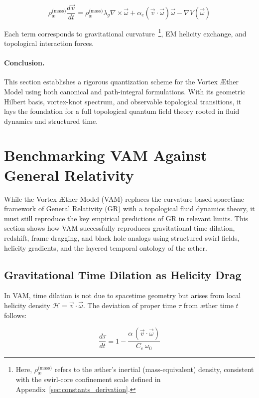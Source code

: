 \documentclass[preprint]{revtex4-2}
\begin{document}
    \[
    \rho_{\text{\ae}}^{\text{(mass)}} \frac{d\vec{v}}{dt} = \rho_{\text{\ae}}^{\text{(mass)}} \lambda_g \nabla \times \vec{\omega} + \alpha_e (\vec{v} \cdot \vec{\omega}) \vec{\omega} - \nabla V(\vec{\omega})
        \label{eq:euler_lagrange_swirl}
    \]

    Each term corresponds to gravitational curvature~\footnote{Here, \textbf{\boldmath\( \rho_{\text{\ae}}^{\text{(mass)}} \)} refers to the æther’s inertial (mass-equivalent) density, consistent with the swirl-core confinement scale defined in Appendix~\ref{sec:constants_derivation}.
}, EM helicity exchange, and topological interaction forces.

    \paragraph{Conclusion.} This section establishes a rigorous quantization scheme for the Vortex \AE{}ther Model using both canonical and path-integral formulations. With its geometric Hilbert basis, vortex-knot spectrum, and observable topological transitions, it lays the foundation for a full topological quantum field theory rooted in fluid dynamics and structured time.


\section{Benchmarking VAM Against General Relativity}
    While the Vortex \AE{}ther Model (VAM) replaces the curvature-based spacetime framework of General Relativity (GR) with a topological fluid dynamics theory, it must still reproduce the key empirical predictions of GR in relevant limits. This section shows how VAM successfully reproduces gravitational time dilation, redshift, frame dragging, and black hole analogs using structured swirl fields, helicity gradients, and the layered temporal ontology of the æther.

    \subsection{Gravitational Time Dilation as Helicity Drag}
    In VAM, time dilation is not due to spacetime geometry but arises from local helicity density \( \mathcal{H} = \vec{v} \cdot \vec{\omega} \). The deviation of proper time \( \tau \) from æther time \( t \) follows:

    \begin{equation}
    \frac{d\tau}{dt} = 1 - \frac{\alpha \, (\vec{v} \cdot \vec{\omega})}{C_e \, \omega_0}
    \label{eq:vam_time_dilation}
    \end{equation}
\end{document}
